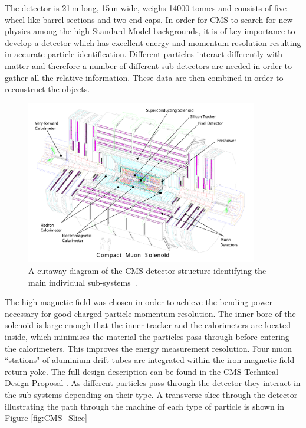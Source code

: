The detector is 21\,m long, 15\,m wide, weighs 14000 tonnes and consists of five wheel-like barrel sections and two end-caps. In order for CMS to search for new physics among the high Standard Model backgrounds, it is of key importance to develop a detector which has excellent energy and momentum resolution resulting in accurate particle identification. Different particles interact differently with matter and therefore a number of different sub-detectors are needed in order to gather all the relative information. These data are then combined in order to reconstruct the objects. 

\begin{figure}[htbp]
\centering
\includegraphics[width=0.9\textwidth]{Figures/Detector/CMS_Structure}
\caption[A cutaway diagram of the CMS detector structure identifying the main individual sub-systems.]{A cutaway diagram of the CMS detector structure identifying the main individual sub-systems~\cite{TDRVOLI}.}
\label{fig:CMS_Struct}
\end{figure}

The high magnetic field was chosen in order to achieve the bending power necessary for good charged particle momentum resolution. The inner bore of the solenoid is large enough that the inner tracker and the calorimeters are located inside, which minimises the material the particles pass through before entering the calorimeters. This improves the energy measurement resolution. Four muon ``stations" of aluminium drift tubes are integrated within the iron magnetic field return yoke. The full design description can be found in the CMS Technical Design Proposal \cite{CMSTDP}. As different particles pass through the detector they interact in the sub-systems depending on their type. A transverse slice through the detector illustrating the path through the machine of each type of particle is shown in Figure \ref{fig:CMS_Slice} 





